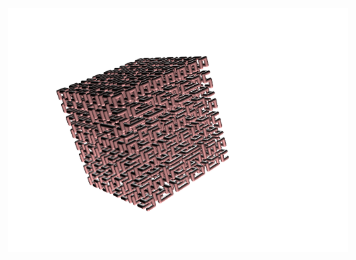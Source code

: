 \begin{center}
\begin{minipage}{7cm}
 \includegraphics[width=9cm]{bildoj/linden-hilbert4.png}
\end{minipage}
\end{center}
